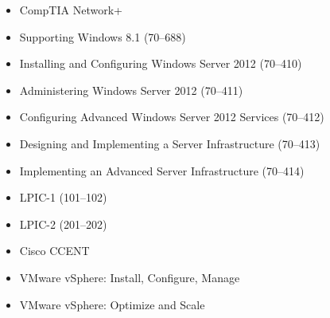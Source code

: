 


\begin{itemize}
  \item CompTIA Network+
  \item Supporting Windows 8.1 (70--688)
  \item Installing and Configuring Windows Server 2012 (70--410)
  \item Administering Windows Server 2012 (70--411)
  \item Configuring Advanced Windows Server 2012 Services (70--412)
  \item Designing and Implementing a Server Infrastructure (70--413)
  \item Implementing an Advanced Server Infrastructure (70--414)
  \item LPIC-1 (101--102)
  \item LPIC-2 (201--202)
  \item Cisco CCENT
  \item VMware vSphere: Install, Configure, Manage
  \item VMware vSphere: Optimize and Scale
\end{itemize}

